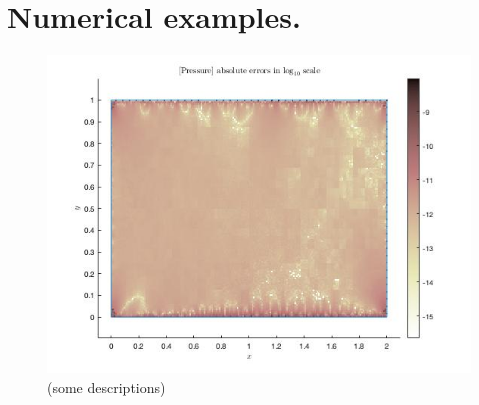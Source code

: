 \section{Numerical examples.}

\begin{figure}[H]
  \centering
  \includegraphics[width=\textwidth]{figures/fig_sample_0.jpg}
  \caption{
    (some descriptions)
  }
  \label{fig:one-figure-example}
\end{figure}


